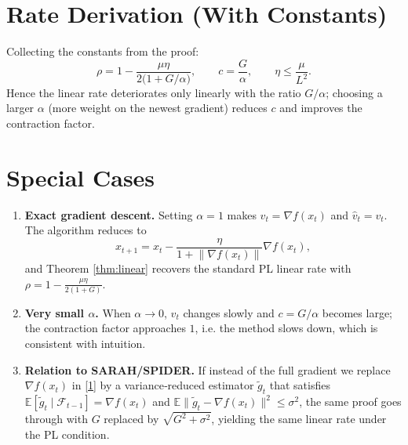 \documentclass{article}
\newcommand{\EE}{\mathbb{E}}
\newcommand{\norm}[1]{\left\|#1\right\|}
\newcommand{\grad}{\nabla}
\begin{document}
\section*{Rate Derivation (With Constants)}
Collecting the constants from the proof:
\[
\rho = 1-\frac{\mu\eta}{2\bigl(1+G/\alpha\bigr)},
\qquad
c = \frac{G}{\alpha},
\qquad
\eta\le\frac{\mu}{L^{2}}.
\]
Hence the linear rate deteriorates only linearly with the ratio $G/\alpha$;
choosing a larger $\alpha$ (more weight on the newest gradient) reduces $c$
and improves the contraction factor.

\section*{Special Cases}
\begin{enumerate}[label=\alph*)]
\item \textbf{Exact gradient descent.} Setting $\alpha=1$ makes $v_{t}= \grad f(x_{t})$
and $\hat v_{t}=v_{t}$.  The algorithm reduces to
\[
x_{t+1}=x_{t}-\frac{\eta}{1+\norm{\grad f(x_{t})}}\grad f(x_{t}),
\]
and Theorem \ref{thm:linear} recovers the standard PL linear rate with
$\rho=1-\frac{\mu\eta}{2(1+G)}$.
\item \textbf{Very small $\alpha$.} When $\alpha\to0$, $v_{t}$ changes slowly and
$c=G/\alpha$ becomes large; the contraction factor approaches $1$, i.e.
the method slows down, which is consistent with intuition.
\item \textbf{Relation to SARAH/SPIDER.} If instead of the full gradient we replace
$\grad f(x_{t})$ in \eqref{1} by a variance‑reduced estimator $\tilde g_{t}$ that
satisfies $\EE[\tilde g_{t}\mid\mathcal{F}_{t-1}]=\grad f(x_{t})$ and
$\EE\|\tilde g_{t}-\grad f(x_{t})\|^{2}\le\sigma^{2}$, the same proof goes through
with $G$ replaced by $\sqrt{G^{2}+\sigma^{2}}$, yielding the same linear rate
under the PL condition.
\end{enumerate}
\end{document}
